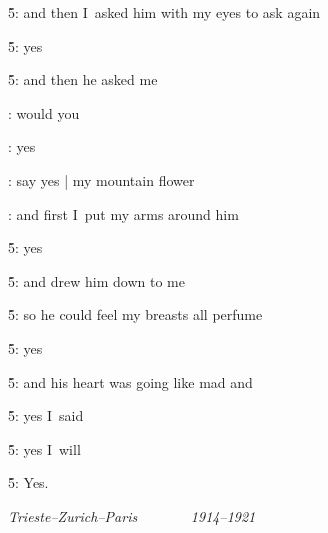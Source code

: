\f5:
and then I~asked him with my eyes to ask again

\f5:
yes

\f5:
and then he asked me

:
would you

:
yes

:
say yes |
my mountain flower

:
and first I~put my arms around him

\f5:
yes

\f5:
and drew him down to me

\f5:
so he could feel my breasts all perfume

\f5:
yes

\f5:
and his heart was going like mad and

\f5:
yes I~said

\f5:
yes I~will

\f5:
Yes.

\medskip

\emph{
Trieste--Zurich--Paris ~ ~ ~ ~ 1914--1921}


